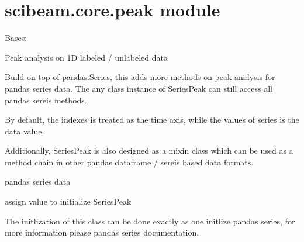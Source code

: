 \documentclass[letterpaper,10pt,english]{sphinxmanual}
\begin{document}
\section{scibeam.core.peak module}
\label{\detokenize{scibeam.core:module-scibeam.core.peak}}\label{\detokenize{scibeam.core:scibeam-core-peak-module}}

\begin{fulllineitems}
\label{\detokenize{scibeam.core:scibeam.core.peak.SeriesPeak}}
Bases: 

Peak analysis on 1D labeled / unlabeled data

Build on top of pandas.Series, this adds more methods on peak analysis for
pandas series data. The any class instance of SeriesPeak can still access
all pandas sereis methods.

By default, the indexes is treated as the time axis, while the values of
series is the data value.

Additionally, SeriesPeak is also designed as a mixin class which can be used
as a method chain in other pandas dataframe / sereis based data formats.

\begin{fulllineitems}
\label{\detokenize{scibeam.core:scibeam.core.peak.SeriesPeak.self}}
 \textendash{} pandas series data

\end{fulllineitems}


\begin{fulllineitems}
\label{\detokenize{scibeam.core:scibeam.core.peak.SeriesPeak.__init__}}
assign value to initialize SeriesPeak

The initlization of this class can be done exactly as one initlize
pandas series, for more information please pandas series documentation.

\end{fulllineitems}


\end{fulllineitems}
\end{document}
